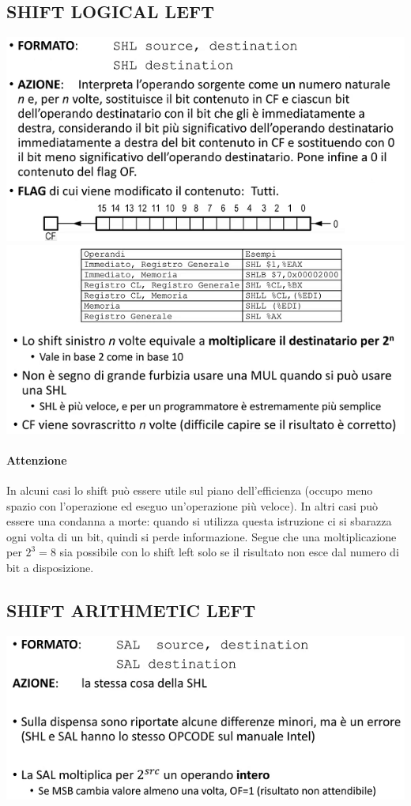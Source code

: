 \documentclass[11pt]{report}
\begin{document}
\subsection{SHIFT LOGICAL LEFT}
\begin{center}
\includegraphics{img/24.PNG}
\includegraphics{img/25.PNG}
\end{center}
\paragraph{Attenzione} In alcuni casi lo shift può essere utile sul piano dell'efficienza (occupo meno spazio con l'operazione ed eseguo un'operazione più veloce). In altri casi può essere una condanna a morte: quando si utilizza questa istruzione ci si sbarazza ogni volta di un bit, quindi si perde informazione. Segue che una moltiplicazione per $2^3=8$  sia possibile con lo shift left solo se il risultato non esce dal numero di bit a disposizione.
\subsection{SHIFT ARITHMETIC LEFT}
\begin{center}
\includegraphics{img/26.PNG}
\end{center}
\end{document}
